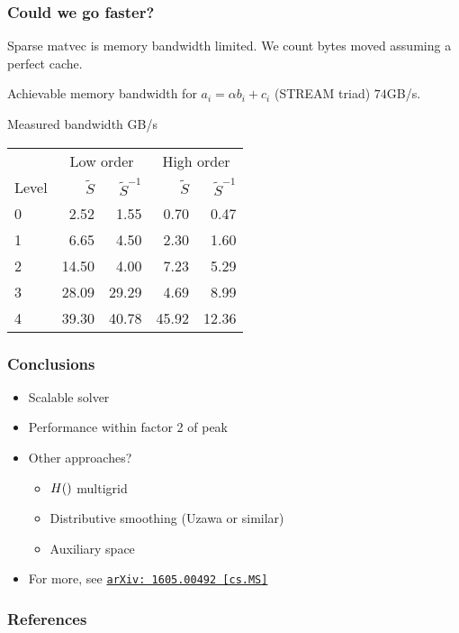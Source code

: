 \documentclass[presentation]{beamer}
\let\div\relax
\DeclareMathOperator{\div}{div}
\newcommand{\arxivlink}[2]{%
  \href{http://www.arxiv.org/abs/#1}%
  {{\small\texttt{arXiv:\,#1\,[#2]}}}%
}
\begin{document}
\begin{frame}
  \frametitle{Could we go faster?}
  Sparse matvec is memory bandwidth limited.  We count bytes moved
  assuming a perfect cache.  

  Achievable memory bandwidth for $a_i = \alpha b_i + c_i$ (STREAM triad) $74$GB/s.

  \begin{block}{Measured bandwidth GB/s}
    \begin{center}
      \begin{tabular}{lrrrr}
        & \multicolumn{2}{c}{Low order} & \multicolumn{2}{c}{High order}\\
        Level & $\tilde{S}$ & $\tilde{S}^{-1}$ & $\tilde{S}$ & $\tilde{S}^{-1}$\\
        0  &   2.52 &   1.55 &    0.70 &   0.47\\
        1  &   6.65 &   4.50 &    2.30 &   1.60\\
        2  &  14.50 &   4.00 &    7.23 &   5.29\\
        3  &  28.09 &  29.29 &    4.69 &   8.99\\
        4  &  39.30 &  40.78 &   45.92 &  12.36\\
      \end{tabular}
    \end{center}
  \end{block}
\end{frame}

\begin{frame}
  \frametitle{Conclusions}

  \begin{itemize}
  \item Scalable solver
  \item Performance within factor 2 of peak
  \item Other approaches?
    \begin{itemize}
    \item $H(\div)$ multigrid \parencite{Arnold:2000}
    \item Distributive smoothing (Uzawa or similar)
    \item Auxiliary space \parencite{Hiptmair:2007}
    \end{itemize}
  \item For more, see \arxivlink{1605.00492}{cs.MS}
  \end{itemize}
\end{frame}

\appendix
\begin{frame}
  \frametitle{References}
  \printbibliography[heading=none]
\end{frame}
\end{document}
